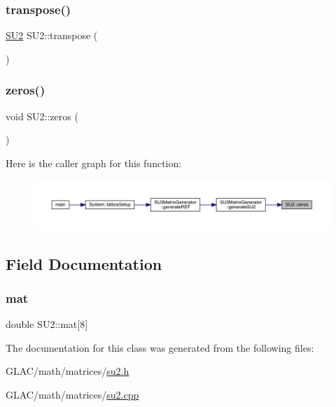 \subsubsection{\texorpdfstring{transpose()}{transpose()}}
{\footnotesize\ttfamily \mbox{\hyperlink{class_s_u2}{S\+U2}} S\+U2\+::transpose (\begin{DoxyParamCaption}{ }\end{DoxyParamCaption})}

\mbox{\label{class_s_u2_a348ca5d38346892060a05f7d9de02916}} 
\subsubsection{\texorpdfstring{zeros()}{zeros()}}
{\footnotesize\ttfamily void S\+U2\+::zeros (\begin{DoxyParamCaption}{ }\end{DoxyParamCaption})\hspace{0.3cm}{\ttfamily [inline]}}

Here is the caller graph for this function\+:\nopagebreak
\begin{figure}[H]
\begin{center}
\leavevmode
\includegraphics[width=350pt]{class_s_u2_a348ca5d38346892060a05f7d9de02916_icgraph}
\end{center}
\end{figure}


\subsection{Field Documentation}
\mbox{\label{class_s_u2_ad4227484be245b63489c44a2bc02a625}} 
\subsubsection{\texorpdfstring{mat}{mat}}
{\footnotesize\ttfamily double S\+U2\+::mat\mbox{[}8\mbox{]}}



The documentation for this class was generated from the following files\+:\begin{DoxyCompactItemize}
\item 
G\+L\+A\+C/math/matrices/\mbox{\hyperlink{su2_8h}{su2.\+h}}\item 
G\+L\+A\+C/math/matrices/\mbox{\hyperlink{su2_8cpp}{su2.\+cpp}}\end{DoxyCompactItemize}

